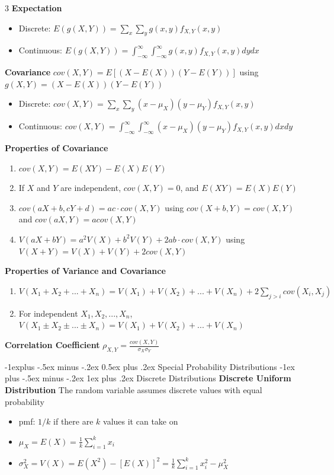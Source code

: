 \documentclass[10pt, landscape]{article}
\makeatletter
\renewcommand{\section}{\@startsection{section}{1}{0mm}%
                                {-1ex plus -.5ex minus -.2ex}%
                                {0.5ex plus .2ex}%
                                {\normalfont\large\bfseries}}
\renewcommand{\section}{\@startsection{section}{2}{0mm}%
                                {-1explus -.5ex minus -.2ex}%
                                {0.5ex plus .2ex}%
                                {\normalfont\normalsize\bfseries}}
\renewcommand{\subsection}{\@startsection{subsection}{3}{0mm}%
                                {-1ex plus -.5ex minus -.2ex}%
                                {1ex plus .2ex}%
                                {\normalfont\small\bfseries}}%
\makeatother
\begin{document}
\begin{multicols*}{3}
\textbf{Expectation}
\begin{itemize}
    \item Discrete: $E(g(X, Y))=\sum_x\sum_y g(x, y)f_{X, Y}(x, y)$
    \item Continuous: $E(g(X, Y))=\int_{-\infty}^\infty\int_{-\infty}^\infty g(x, y) f_{X, Y}(x, y)dydx$
\end{itemize}

\textbf{Covariance} $cov(X, Y)=E[(X-E(X))(Y-E(Y))]$ using $g(X, Y)=(X-E(X))(Y-E(Y))$
\begin{itemize}
    \item Discrete: $cov(X, Y)=\sum_x\sum_y(x-\mu_X)(y-\mu_Y)f_{X, Y}(x, y)$
    \item Continuous: $cov(X, Y)=\int_{-\infty}^\infty\int_{-\infty}^\infty(x-\mu_X)(y-\mu_Y)f_{X, Y}(x, y)dxdy$
\end{itemize}

\textbf{Properties of Covariance}
\begin{enumerate}
    \item $cov(X, Y)=E(XY)-E(X)E(Y)$
    \item If $X$ and $Y$ are independent, $cov(X, Y)=0$, and $E(XY)=E(X)E(Y)$
    \item $cov(aX+b, cY+d)=ac \cdot cov(X, Y)$ using $cov(X+b, Y)=cov(X, Y)$ and $cov(aX, Y)=acov(X, Y)$
    \item $V(aX+bY)=a^2V(X)+b^2V(Y)+2ab\cdot cov(X, Y)$ using $V(X+Y)=V(X)+V(Y)+2cov(X, Y)$
\end{enumerate}

\textbf{Properties of Variance and Covariance}
\begin{enumerate}
    \item $V(X_1+X_2+...+X_n)=V(X_1)+V(X_2)+...+V(X_n)+2 \sum_{j > i}cov(X_i, X_j)$
    \item For independent $X_1, X_2, ... , X_n$, $V(X_1\pm X_2 \pm ... \pm X_n)=V(X_1)+V(X_2)+...+V(X_n)$
\end{enumerate}

\textbf{Correlation Coefficient} $\rho_{X, Y}=\frac{cov(X,Y)}{\sigma_X\sigma_Y}$

\section{Special Probability Distributions}
\subsection{Discrete Distributions}
\textbf{Discrete Uniform Distribution} The random variable assumes discrete values with equal probability
\begin{itemize}
    \item pmf: $1/k$ if there are $k$ values it can take on
    \item $\mu_X=E(X)=\frac{1}{k}\sum_{i=1}^kx_i$
    \item $\sigma_X^2=V(X)=E(X^2)-[E(X)]^2=\frac{1}{k}\sum_{i=1}^k x_i^2-\mu_X^2$
\end{itemize}


\end{multicols*}
\end{document}
